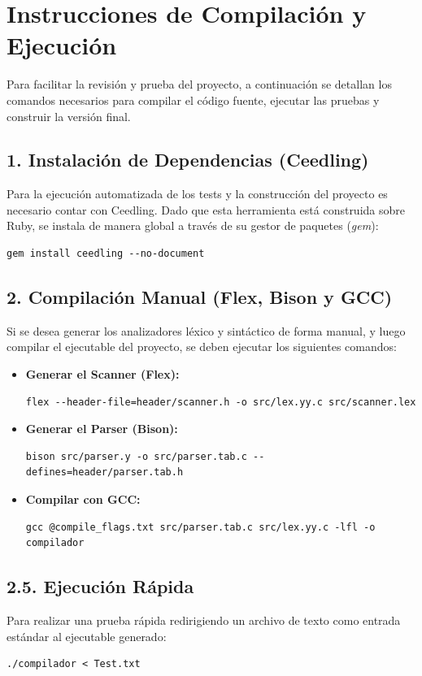 \documentclass[11pt, a4paper]{article}
\begin{document}
\section{Instrucciones de Compilación y Ejecución}
Para facilitar la revisión y prueba del proyecto, a continuación se detallan los comandos necesarios para compilar el código fuente, ejecutar las pruebas y construir la versión final.

\subsection*{1. Instalación de Dependencias (Ceedling)}
Para la ejecución automatizada de los tests y la construcción del proyecto es necesario contar con Ceedling. Dado que esta herramienta está construida sobre Ruby, se instala de manera global a través de su gestor de paquetes (\textit{gem}):
\begin{verbatim}
gem install ceedling --no-document
\end{verbatim}

\subsection*{2. Compilación Manual (Flex, Bison y GCC)}
Si se desea generar los analizadores léxico y sintáctico de forma manual, y luego compilar el ejecutable del proyecto, se deben ejecutar los siguientes comandos:

\begin{itemize}
    \item \textbf{Generar el Scanner (Flex):}
\begin{verbatim}
flex --header-file=header/scanner.h -o src/lex.yy.c src/scanner.lex
\end{verbatim}

    \item \textbf{Generar el Parser (Bison):}
\begin{verbatim}
bison src/parser.y -o src/parser.tab.c --defines=header/parser.tab.h
\end{verbatim}

    \item \textbf{Compilar con GCC:}
\begin{verbatim}
gcc @compile_flags.txt src/parser.tab.c src/lex.yy.c -lfl -o compilador
\end{verbatim}
\end{itemize}

\subsection*{2.5. Ejecución Rápida}
Para realizar una prueba rápida redirigiendo un archivo de texto como entrada estándar al ejecutable generado:
\begin{verbatim}
./compilador < Test.txt
\end{verbatim}
\end{document}
